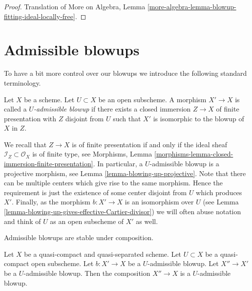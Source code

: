 \begin{proof}
Translation of More on Algebra, Lemma
\ref{more-algebra-lemma-blowup-fitting-ideal-locally-free}.
\end{proof}







\section{Admissible blowups}
\label{section-admissible-blowups}

\noindent
To have a bit more control over our blowups we introduce the following
standard terminology.

\begin{definition}
\label{definition-admissible-blowup}
Let $X$ be a scheme. Let $U \subset X$ be an open subscheme. A morphism
$X' \to X$ is called a {\it $U$-admissible blowup} if there exists a
closed immersion $Z \to X$ of finite presentation with $Z$ disjoint from
$U$ such that $X'$ is isomorphic to the blowup of $X$ in $Z$.
\end{definition}

\noindent
We recall that $Z \to X$ is of finite presentation if and only if the
ideal sheaf $\mathcal{I}_Z \subset \mathcal{O}_X$ is of finite type, see
Morphisms, Lemma \ref{morphisms-lemma-closed-immersion-finite-presentation}.
In particular, a $U$-admissible blowup is a projective morphism, see
Lemma \ref{lemma-blowing-up-projective}.
Note that there can be multiple centers which give rise to the same morphism.
Hence the requirement is just the existence of some center disjoint from
$U$ which produces $X'$.
Finally, as the morphism $b : X' \to X$ is an isomorphism over $U$ (see
Lemma \ref{lemma-blowing-up-gives-effective-Cartier-divisor}) we will often
abuse notation and think of $U$ as an open subscheme of $X'$ as well.

\begin{lemma}
\label{lemma-composition-admissible-blowups}
\begin{slogan}
Admissible blowups are stable under composition.
\end{slogan}
Let $X$ be a quasi-compact and quasi-separated scheme.
Let $U \subset X$ be a quasi-compact open subscheme.
Let $b : X' \to X$ be a $U$-admissible blowup.
Let $X'' \to X'$ be a $U$-admissible blowup.
Then the composition $X'' \to X$ is a $U$-admissible blowup.
\end{lemma}

